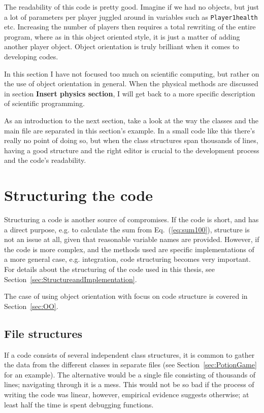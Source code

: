 The readability of this code is pretty good. Imagine if we had no objects, but just a lot of parameters per player juggled around in variables such as \verb+Player1health+ etc. Increasing the number of players then requires a total rewriting of the entire program, where as in this object oriented style, it is just a matter of adding another player object. Object orientation is truly brilliant when it comes to developing codes. 

In this section I have not focused too much on scientific computing, but rather on the use of object orientation in general. When the physical methods are discussed in section \textbf{Insert physics section}, I will get back to a more specific description of scientific programming.

As an introduction to the next section, take a look at the way the classes and the main file are separated in this section's example. In a small code like this there's really no point of doing so, but when the class structures span thousands of lines, having a good structure and the right editor is crucial to the development process and the code's readability.


\section{Structuring the code}

Structuring a code is another source of compromises. If the code is short, and has a direct purpose, e.g. to calculate the sum from Eq.~(\ref{eq:sum100}), structure is not an issue at all, given that reasonable variable names are provided. However, if the code is more complex, and the methods used are specific implementations of a more general case, e.g. integration, code structuring becomes very important. For details about the structuring of the code used in this thesis, see Section~\ref{sec:StructureandImplementation}.

The case of using object orientation with focus on code structure is covered in Section~\ref{sec:OO}.

\subsection{File structures}

If a code consists of several independent class structures, it is common to gather the data from the different classes in separate files (see Section~\ref{sec:PotionGame} for an example). The alternative would be a single file consisting of thousands of lines; navigating through it is a mess. This would not be so bad if the process of writing the code was linear, however, empirical evidence suggests otherwise; at least half the time is spent debugging functions.

